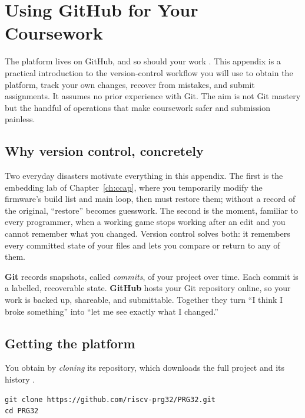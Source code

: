 \chapter{Using GitHub for Your Coursework}
\label{app:github}

The \prg platform lives on GitHub, and so should your work \citep{prg32repo}. This
appendix is a practical introduction to the version-control workflow you will use
to obtain the platform, track your own changes, recover from mistakes, and submit
assignments. It assumes no prior experience with Git. The aim is not Git mastery
but the handful of operations that make coursework safer and submission painless.

\section{Why version control, concretely}

Two everyday disasters motivate everything in this appendix. The first is the
embedding lab of Chapter~\ref{ch:ccap}, where you temporarily modify the firmware's
build list and main loop, then must restore them; without a record of the original,
``restore'' becomes guesswork. The second is the moment, familiar to every
programmer, when a working game stops working after an edit and you cannot remember
what you changed. Version control solves both: it remembers every committed state of
your files and lets you compare or return to any of them.

\begin{prgconcept}
\textbf{Git} records snapshots, called \emph{commits}, of your project over time.
Each commit is a labelled, recoverable state. \textbf{GitHub} hosts your Git
repository online, so your work is backed up, shareable, and submittable. Together
they turn ``I think I broke something'' into ``let me see exactly what I changed.''
\end{prgconcept}

\section{Getting the platform}

You obtain \prg by \emph{cloning} its repository, which downloads the full project
and its history \citep{prg32repo}.

\begin{lstlisting}[style=bash,caption={Cloning the platform repository.}]
git clone https://github.com/riscv-prg32/PRG32.git
cd PRG32
\end{lstlisting}

